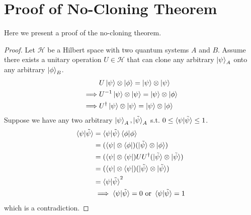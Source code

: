 \appendix
\appendixpage
\addappheadtotoc
\section{Proof of No-Cloning Theorem}
Here we present a proof of the no-cloning theorem.
\begin{proof}
    Let $\mathcal{H}$ be a Hilbert space with two quantum systems $A$ and $B$.
    Assume there exists a unitary operation $U\in\mathcal{H}$ that can clone any arbitrary $\ket{\psi}_A$ onto any arbitrary $\ket{\phi}_B$.
    \begin{align}
        &U\ket{\psi}\otimes\ket{\phi} = \ket{\psi}\otimes\ket{\psi}\\
        \implies &U^{-1}\ket{\psi}\otimes\ket{\psi} = \ket{\psi}\otimes\ket{\phi}\\
        \implies &U^{\dagger}\ket{\psi}\otimes\ket{\psi} = \ket{\psi}\otimes\ket{\phi}\\
    \end{align}
    Suppose we have any two arbitrary $\ket{\psi}_A,\ket{\tilde{\psi}}_A$ s.t. $0 \leq \braket{\psi|\tilde{\psi}} \leq 1$.
    \begin{align}
        \braket{\psi|\tilde{\psi}} & = \braket{\psi|\tilde{\psi}} \braket{\phi|\phi}\\
        & = (\bra{\psi}\otimes\bra{\phi})(\ket{\tilde{\psi}}\otimes\ket{\phi})\\
        & = (\bra{\psi}\otimes\bra{\psi})UU^{\dagger}(\ket{\tilde{\psi}}\otimes\ket{\tilde{\psi}})\\
        & = (\bra{\psi}\otimes\bra{\psi})(\ket{\tilde{\psi}}\otimes\ket{\tilde{\psi}})\\
        & = \braket{\psi|\tilde{\psi}}^2\\
        &\implies \braket{\psi|\tilde{\psi}} = 0 \text{ or } \braket{\psi|\tilde{\psi}} = 1
    \end{align}
    which is a contradiction.
\end{proof}